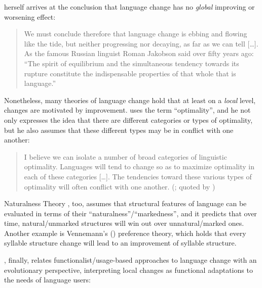 \documentclass[output=paper,hidelinks]{langscibook}
\begin{document}
\citet{Aitchison_2001} herself arrives at the conclusion that language change has no \textit{global} improving or worsening effect:

\begin{quote}
We must conclude therefore that language change is ebbing and flowing like the tide, but neither progressing nor decaying, as far as we can tell […]. As the famous Russian linguist Roman Jakobson said over fifty years ago: ``The spirit of equilibrium and the simultaneous tendency towards its rupture constitute the indispensable properties of that whole that is language.'' \citep[254--255]{Aitchison_2001}
\end{quote}

Nonetheless, many theories of language change hold that at least on a \textit{local} level, changes are motivated by improvement. \citet{Langacker_1977} uses the term ``optimality'', and he not only expresses the idea that there are different categories or types of optimality, but he also assumes that these different types may be in conflict with one another:

\begin{quote}
I believe we can isolate a number of broad categories of linguistic optimality. Languages will tend to change so as to maximize optimality in each of these categories […]. The tendencies toward these various types of optimality will often conflict with one another. (\citealt[102]{Langacker_1977}; quoted by \citealt[181]{Haspelmath1999optimality})
\end{quote}

\begin{sloppypar}
Naturalness Theory \citep{Wurzel_1984,Mayerthaler_1980}, too, assumes that structural features of language can be evaluated in terms of their ``naturalness''\slash``markedness'', and it predicts that over time, natural\slash unmarked structures will win out over unnatural\slash marked ones. Another example is Vennemann's (\citeyear{Vennemann_1988,Vennemann_1993}) preference theory, which holds that every syllable structure change will lead to an improvement of syllable structure. 
\end{sloppypar}


\citet{Haspelmath1999optimality}, finally, relates functionalist/usage-based approaches to language change with an evolutionary perspective, interpreting local changes as functional adaptations to the needs of language users:
\end{document}
